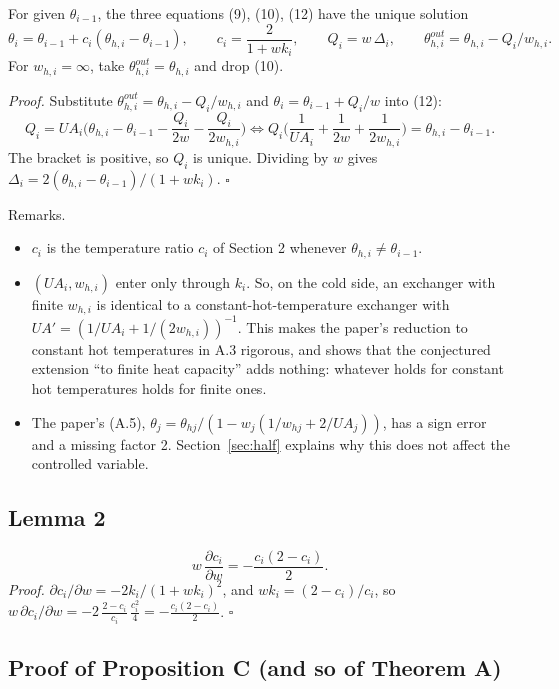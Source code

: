 \documentclass[11pt,a4paper]{report}
\begin{document}
For given \(\theta_{i-1}\), the three equations (9), (10), (12) have the unique solution
\[\theta_i = \theta_{i-1} + c_i(\theta_{h,i} - \theta_{i-1}), \qquad c_i = \frac{2}{1 + w k_i}, \qquad
   Q_i = w\,\Delta_i, \qquad \theta^{out}_{h,i} = \theta_{h,i} - Q_i/w_{h,i}.\]
For \(w_{h,i} = \infty\), take \(\theta^{out}_{h,i} = \theta_{h,i}\) and drop (10).

\emph{Proof.} Substitute \(\theta^{out}_{h,i} = \theta_{h,i} - Q_i/w_{h,i}\) and \(\theta_i = \theta_{i-1} + Q_i/w\)
into (12):
\[Q_i = UA_i\Big(\theta_{h,i} - \theta_{i-1} - \frac{Q_i}{2w} - \frac{Q_i}{2w_{h,i}}\Big)
   \iff Q_i\Big(\frac{1}{UA_i} + \frac{1}{2w} + \frac{1}{2w_{h,i}}\Big) = \theta_{h,i} - \theta_{i-1}.\]
The bracket is positive, so \(Q_i\) is unique. Dividing by \(w\) gives
\(\Delta_i = 2(\theta_{h,i} - \theta_{i-1})/(1 + w k_i)\). \(\square\)

Remarks.
\begin{itemize}
\item \(c_i\) is the temperature ratio \(c_i\) of Section 2 whenever \(\theta_{h,i} \ne \theta_{i-1}\).
\item \((UA_i, w_{h,i})\) enter only through \(k_i\). So, on the cold side, an exchanger with finite \(w_{h,i}\) is
identical to a constant-hot-temperature exchanger with \(UA' = (1/UA_i + 1/(2w_{h,i}))^{-1}\). This makes the paper's
reduction to constant hot temperatures in A.3 rigorous, and shows that the conjectured extension ``to finite heat
capacity'' adds nothing: whatever holds for constant hot temperatures holds for finite ones.
\item The paper's (A.5), \(\theta_j = \theta_{hj}/(1 - w_j(1/w_{hj} + 2/UA_j))\), has a sign error and a missing
factor 2. Section~\ref{sec:half} explains why this does not affect the controlled variable.
\end{itemize}

\subsection{Lemma 2}

\[w\,\frac{\partial c_i}{\partial w} = -\frac{c_i(2-c_i)}{2}.\]
\emph{Proof.} \(\partial c_i/\partial w = -2k_i/(1+wk_i)^2\), and \(wk_i = (2-c_i)/c_i\), so
\(w\,\partial c_i/\partial w = -2\,\frac{2-c_i}{c_i}\,\frac{c_i^2}{4} = -\frac{c_i(2-c_i)}{2}\). \(\square\)

\subsection{Proof of Proposition C (and so of Theorem A)}
\end{document}
